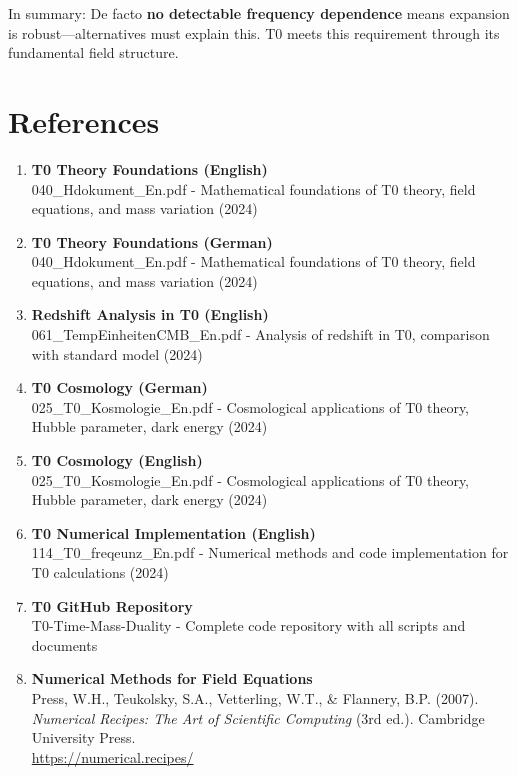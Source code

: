 	In summary: De facto \textbf{no detectable frequency dependence} means expansion is robust—alternatives must explain this. T0 meets this requirement through its fundamental field structure.
	
	\section{References}
	
	\begin{enumerate}
		\item \textbf{T0 Theory Foundations (English)} \\
		040\_Hdokument\_En.pdf - Mathematical foundations of T0 theory, field equations, and mass variation (2024)
		
		\item \textbf{T0 Theory Foundations (German)} \\
		040\_Hdokument\_En.pdf - Mathematical foundations of T0 theory, field equations, and mass variation (2024)
		
		\item \textbf{Redshift Analysis in T0 (English)} \\
		061\_TempEinheitenCMB\_En.pdf - Analysis of redshift in T0, comparison with standard model (2024)
		
		\item \textbf{T0 Cosmology (German)} \\
		025\_T0\_Kosmologie\_En.pdf - Cosmological applications of T0 theory, Hubble parameter, dark energy (2024)
		
		\item \textbf{T0 Cosmology (English)} \\
		025\_T0\_Kosmologie\_En.pdf - Cosmological applications of T0 theory, Hubble parameter, dark energy (2024)
		
		\item \textbf{T0 Numerical Implementation (English)} \\
		114\_T0\_freqeunz\_En.pdf - Numerical methods and code implementation for T0 calculations (2024)
		
		\item \textbf{T0 GitHub Repository} \\
		T0-Time-Mass-Duality - Complete code repository with all scripts and documents
		
		\item \textbf{Numerical Methods for Field Equations} \\
		Press, W.H., Teukolsky, S.A., Vetterling, W.T., \& Flannery, B.P. (2007). \textit{Numerical Recipes: The Art of Scientific Computing} (3rd ed.). Cambridge University Press.\\
		\url{https://numerical.recipes/}
		

\end{enumerate}
